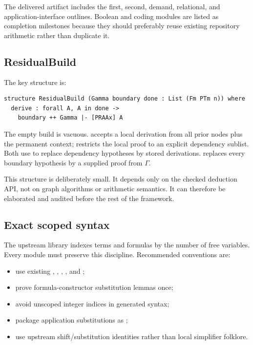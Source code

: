 The delivered artifact includes the first, second, demand, relational, and application-interface outlines.  Boolean and coding modules are listed as completion milestones because they should preferably reuse existing repository arithmetic rather than duplicate it.

\subsection{ResidualBuild}

The key structure is:

\begin{lstlisting}
structure ResidualBuild (Gamma boundary done : List (Fm PTm n)) where
  derive : forall A, A in done ->
    boundary ++ Gamma |- [PRAAx] A
\end{lstlisting}

The empty build is vacuous.   accepts a local derivation from all prior nodes plus the permanent context;  restricts the local proof to an explicit dependency sublist.  Both use  to replace dependency hypotheses by stored derivations.   replaces every boundary hypothesis by a supplied proof from \(\Gamma\).

This structure is deliberately small.  It depends only on the checked deduction API, not on graph algorithms or arithmetic semantics.  It can therefore be elaborated and audited before the rest of the framework.

\subsection{Exact scoped syntax}

The upstream library indexes terms and formulas by the number of free variables.  Every module must preserve this discipline.  Recommended conventions are:

\begin{itemize}
\item use existing , , , , and ;
\item prove formula-constructor substitution lemmas once;
\item avoid unscoped integer indices in generated syntax;
\item package application substitutions as ;
\item use upstream shift/substitution identities rather than local simplifier folklore.
\end{itemize}

